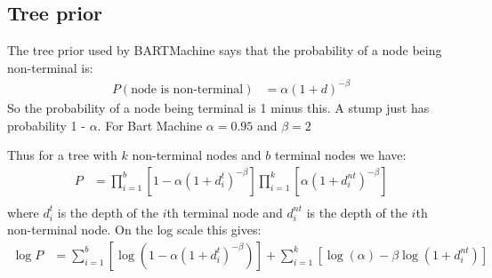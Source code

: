 \documentclass{article}
\begin{document}
\subsection*{Tree prior}

The tree prior used by BARTMachine says that the probability of a node being non-terminal is:
\begin{align*}
P(\mbox{node is non-terminal}) &= \alpha (1 + d)^{-\beta}
\end{align*}
So the probability of a node being terminal is 1 minus this. A stump just has probability 1 - $\alpha$. For Bart Machine $\alpha = 0.95$ and $\beta = 2$

Thus for a tree with $k$ non-terminal nodes and $b$ terminal nodes we have:
\begin{align*}
P &= \prod_{i=1}^b \left[ 1 - \alpha (1 + d^t_i)^{-\beta} \right] \prod_{i=1}^k \left[ \alpha (1 + d^{nt}_i)^{-\beta} \right] \\
\end{align*}
where $d^t_i$ is the depth of the $i$th terminal node and $d^{nt}_i$ is the depth of the $i$th non-terminal node.
On the log scale this gives:
\begin{align*}
\log P &= \sum_{i=1}^b \left[ \log \left(1 - \alpha(1 + d^t_i)^{-\beta} \right) \right] + \sum_{i=1}^k \left[ \log(\alpha) - \beta \log(1 + d^{nt}_i) \right] \\
\end{align*}
\end{document}
